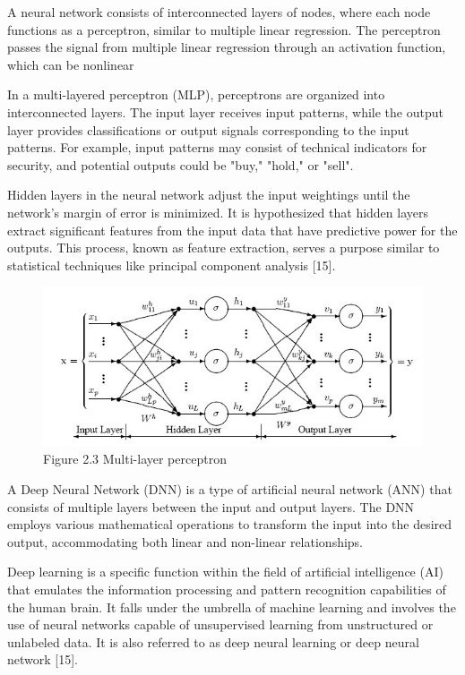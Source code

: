 A neural network consists of interconnected layers of nodes, where each node functions as a perceptron, similar to multiple linear regression. The perceptron passes the signal from multiple linear regression through an activation function, which can be nonlinear

In a multi-layered perceptron (MLP), perceptrons are organized into interconnected layers. The input layer receives input patterns, while the output layer provides classifications or output signals corresponding to the input patterns. 
For example, input patterns may consist of technical indicators for security, and potential outputs could be "buy," "hold," or "sell".

Hidden layers in the neural network adjust the input weightings until the network's margin of error is minimized. It is hypothesized that hidden layers extract significant features from the input data that have predictive power for the outputs. This process, known as feature extraction, serves a purpose similar to statistical techniques like principal component analysis [15].
\begin{center}
    \begin{figure}[!htp]
        \centering
        \includegraphics[width=0.8 \textwidth]{image/MLFN_with_weights.jpeg}
        \caption{Figure 2.3 Multi-layer perceptron}
        \label{subsection}
    \end{figure}
    \end{center}

A Deep Neural Network (DNN) is a type of artificial neural network (ANN) that consists of multiple layers between the input and output layers. The DNN employs various mathematical operations to transform the input into the desired output, accommodating both linear and non-linear relationships.

Deep learning is a specific function within the field of artificial intelligence (AI) that emulates the information processing and pattern recognition capabilities of the human brain. It falls under the umbrella of machine learning and involves the use of neural networks capable of unsupervised learning from unstructured or unlabeled data. It is also referred to as deep neural learning or deep neural network [15].

